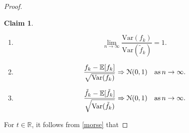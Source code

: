 \documentclass{amsart}
\theoremstyle{definition}
\newtheorem{claim}[thm]{Claim}
\newcommand{\R}{\mathbb{R}}
\newcommand{\E}{\mathbb{E}}
\newcommand{\var}{\mathrm{Var}}
\renewcommand{\1}{\mathbb{1}}
\begin{document}
\begin{proof}
\begin{claim}
\begin{enumerate}
\item\label{var_equiv} \begin{equation*}\lim_{n\to\infty}\frac{\var(f_k)}{
\var(\tilde{f}_k)}=1.\end{equation*}
\item\label{clt_above} \begin{equation*} \frac{f_k-\E[f_k]}{\sqrt{\var(f_k)}}
\Rightarrow\mathcal{N}(0,1)\quad  {\rm as\, } n\to\infty.
\end{equation*}
\item \label{clt_below}\begin{equation*} \frac{\tilde{f}_k-\E[\tilde{f}_k]}{
\sqrt{\var(\tilde{f}_k)}}\Rightarrow\mathcal{N}(0,1)\quad
  {\rm as\, } n\to\infty.\end{equation*}
\end{enumerate}

\end{claim}

For $t\in\R$, it follows from \eqref{morse} that


\end{proof}
\end{document}
